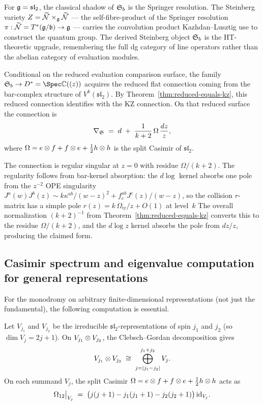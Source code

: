 For $\mathfrak{g} = \mathfrak{sl}_2$, the classical shadow of $\mathfrak{S}_b$ is the
Springer resolution. The Steinberg variety
$Z = \widetilde{\mathcal{N}} \times_{\mathfrak{g}} \widetilde{\mathcal{N}}$ — the
self-fibre-product of the Springer resolution
$\pi: \widetilde{\mathcal{N}} = T^*(\mathfrak{g}/\mathfrak{b}) \to \mathfrak{g}$ — carries the
convolution product Kazhdan--Lusztig use to construct the quantum
group. The derived Steinberg object $\mathfrak{S}_b$ is the HT-theoretic
upgrade, remembering the full dg category of line operators rather
than the abelian category of evaluation modules.

\begin{construction}
\label{constr:steinberg-sl2}
Conditional on the reduced evaluation comparison surface, the family
$\fS_b \to D^* = \Spec \CC((z))$ acquires the reduced flat connection
coming from the bar-complex structure of $V^k(\mathfrak{sl}_2)$. By
Theorem~\ref{thm:reduced-equals-kz}, this reduced connection identifies
with the KZ connection. On that reduced surface the connection is
\[
 \nabla_{\mathfrak{S}} \;=\; d \;+\; \frac{1}{k+2}\,\Omega\,\frac{dz}{z},
\]
where $\Omega = e \otimes f + f \otimes e + \tfrac{1}{2} h \otimes h$ is the split Casimir of $\mathfrak{sl}_2$.

The connection is regular singular at $z = 0$ with residue $\Omega/(k+2)$. The regularity follows from bar-kernel absorption: the $d\log$ kernel absorbs one pole from the $z^{-2}$ OPE singularity $J^a(w)J^b(z) \sim k\kappa^{ab}/(w-z)^2 + f^{ab}_c J^c(z)/(w-z)$, so the collision $r$-matrix has a simple pole $r(z) = k\,\Omega_{\mathrm{tr}}/z + O(1)$ at level~$k$ The overall normalization $(k+2)^{-1}$ from Theorem~\ref{thm:reduced-equals-kz} converts this to the residue $\Omega/(k+2)$, and the $d\log z$ kernel absorbs the pole from $dz/z$, producing the claimed form.
\end{construction}

\subsection{Casimir spectrum and eigenvalue computation for general representations}
\label{subsec:casimir-general}

For the monodromy on arbitrary finite-dimensional representations (not just the fundamental), the following computation is essential.

\begin{proposition}
\label{prop:casimir-general-sl2}
Let $V_{j_1}$ and $V_{j_2}$ be the irreducible $\mathfrak{sl}_2$-representations of spin $j_1$ and $j_2$ (so $\dim V_j = 2j+1$). On $V_{j_1} \otimes V_{j_2}$, the Clebsch--Gordan decomposition gives
\[
 V_{j_1} \otimes V_{j_2} \;\cong\; \bigoplus_{j = |j_1 - j_2|}^{j_1 + j_2} V_j.
\]
On each summand $V_j$, the split Casimir
$\Omega = e \otimes f + f \otimes e + \tfrac{1}{2} h \otimes h$ acts as
\[
 \Omega_{12}\big|_{V_j} \;=\; \bigl(j(j+1) - j_1(j_1+1) - j_2(j_2+1)\bigr)\,\mathrm{id}_{V_j}.
\]
\end{proposition}

